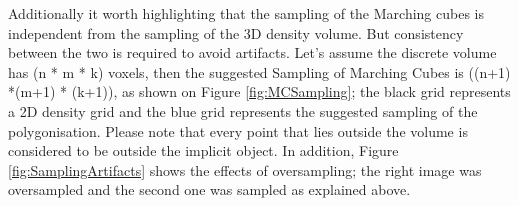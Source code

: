 \documentclass{subfiles}
\begin{document}
\par Additionally it worth highlighting that the sampling of the Marching cubes is independent from the sampling of the 3D density volume. But consistency between the two is required to avoid artifacts. Let’s assume the discrete volume has (n * m * k) voxels, then the suggested Sampling of Marching Cubes is ((n+1) *(m+1) * (k+1)), as shown on Figure \ref{fig:MCSampling}; the black grid represents a 2D density grid and the blue grid represents the suggested sampling of the polygonisation. Please note that every point that lies outside the volume is considered to be outside the implicit object. In addition, Figure \ref{fig:SamplingArtifacts} shows the effects of oversampling; the right image was oversampled and the second one was sampled as explained above.

    \begin{figure} [h!]
    	\begin{subfigure}[t]{.49\textwidth}
    		

\end{subfigure}
\end{figure}
\end{document}
